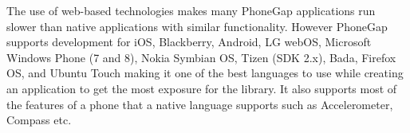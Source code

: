 The use of web-based technologies makes many PhoneGap applications run slower than native applications with similar functionality.
However PhoneGap supports development for iOS, Blackberry, Android,
LG webOS, Microsoft Windows Phone (7 and 8), Nokia Symbian OS, Tizen
(SDK 2.x), Bada, Firefox OS, and Ubuntu Touch making it one of the
best languages to use while creating an application to get the most
exposure for the library. It also supports most of the features of
a phone that a native language supports such as Accelerometer, Compass
etc.




